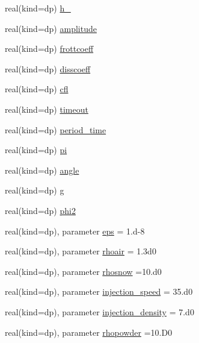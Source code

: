 \begin{DoxyCompactItemize}
\item 
real(kind=dp) \mbox{\hyperlink{namespaceglobalparam_afa512f0663f1649ec948dd8629ded9c2}{h\+\_}}
\item 
real(kind=dp) \mbox{\hyperlink{namespaceglobalparam_ad4de2aae56528f5e68832e367c812b7e}{amplitude}}
\item 
real(kind=dp) \mbox{\hyperlink{namespaceglobalparam_a3d60c54a7f29c018175090d8f352e532}{frottcoeff}}
\item 
real(kind=dp) \mbox{\hyperlink{namespaceglobalparam_a2b80e7d2d9fedcf41afb3a695951758b}{disscoeff}}
\item 
real(kind=dp) \mbox{\hyperlink{namespaceglobalparam_adfd0d04d365d8eea624298b512502b3a}{cfl}}
\item 
real(kind=dp) \mbox{\hyperlink{namespaceglobalparam_a10139a2787968ad3cf07f503ad8dd164}{timeout}}
\item 
real(kind=dp) \mbox{\hyperlink{namespaceglobalparam_aedbaf94b837b9fa76dfe9fb6d99b21b4}{period\+\_\+time}}
\item 
real(kind=dp) \mbox{\hyperlink{namespaceglobalparam_af8b4334cb676810d60c0e1a746531412}{pi}}
\item 
real(kind=dp) \mbox{\hyperlink{namespaceglobalparam_afc46f9587744d04e67298c60303cd5f0}{angle}}
\item 
real(kind=dp) \mbox{\hyperlink{namespaceglobalparam_a5ea70464e51d2dc580f4c6c8b451cb01}{g}}
\item 
real(kind=dp) \mbox{\hyperlink{namespaceglobalparam_a7e2e3cc9c0b15b0250b31dd03fb704c6}{phi2}}
\item 
real(kind=dp), parameter \mbox{\hyperlink{namespaceglobalparam_a50294033ac3a178743643d3203a2d364}{eps}} = 1.d-\/8
\item 
real(kind=dp), parameter \mbox{\hyperlink{namespaceglobalparam_a1c7a6cb7b83fcf9d8d91ed682e3f332d}{rhoair}} = 1.\+3d0
\item 
real(kind=dp), parameter \mbox{\hyperlink{namespaceglobalparam_a81ffdb6e04df75fd95fe27a7fffc1328}{rhosnow}} =10.d0
\item 
real(kind=dp), parameter \mbox{\hyperlink{namespaceglobalparam_abc246d4846a0210b41718b0d3cc67dc0}{injection\+\_\+speed}} = 35.d0
\item 
real(kind=dp), parameter \mbox{\hyperlink{namespaceglobalparam_a241102bcabaffc164f5d5bb9dcd1f2d8}{injection\+\_\+density}} = 7.d0
\item 
real(kind=dp), parameter \mbox{\hyperlink{namespaceglobalparam_a6c7de558883b37c3d3e5e7b55250ed99}{rhopowder}} =10.D0
\item 

\end{DoxyCompactItemize}

